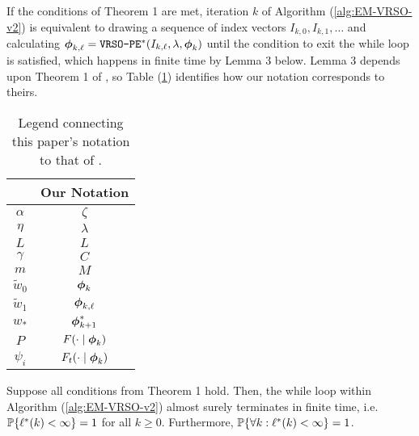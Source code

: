 If the conditions of Theorem 1 are met, iteration $k$ of Algorithm (\ref{alg:EM-VRSO-v2}) is equivalent to drawing a sequence of index vectors $I_{k,0},I_{k,1},\ldots$ and calculating $\boldsymbol{\phi}_{k,\ell} = \texttt{VRSO-PE}^*(I_{k,\ell},\lambda,\boldsymbol{\phi}_{k})$ until the condition to exit the while loop is satisfied, which happens in finite time by Lemma 3 below. Lemma 3 depends upon Theorem 1 of \citet{Johnson:2013}, so Table (\ref{tbl:notation}) identifies how our notation corresponds to theirs.
%
\begin{table}[]
\centering
\begin{tabular}{c|c}
\citet{Johnson:2013}                  & Our Notation                          \\ \hline
$\alpha$                              & $\zeta$                               \\
$\eta$                                & $\lambda$                             \\
$L$                                   & $L$                                   \\
$\gamma$                              & $C$                                   \\
$m$                                   & $M$                                   \\
$\tilde{w}_0$                         & $\boldsymbol{\phi}_{k}$                          \\
$\tilde{w}_1$                         & $\boldsymbol{\phi}_{k,\ell}$                     \\
$w_{*}$                               & $\boldsymbol{\phi}^*_{k+1}$                      \\
$P$                                   & $F(\cdot \mid \boldsymbol{\phi}_k)$              \\
$\psi_i$                              & $F_t(\cdot \mid \boldsymbol{\phi}_k)$                         
\end{tabular}
\caption{Legend connecting this paper's notation to that of \citet{Johnson:2013}.}
\label{tbl:notation}
\end{table}

\begin{lemma}
    Suppose all conditions from Theorem 1 hold. Then, the while loop within Algorithm (\ref{alg:EM-VRSO-v2}) almost surely terminates in finite time, i.e. $\mathbb{P}\{\ell^*(k) < \infty\} = 1$ for all $k \geq 0$. Furthermore, $\mathbb{P}\{\forall k : \ell^*(k) < \infty \} = 1$.
\end{lemma}

